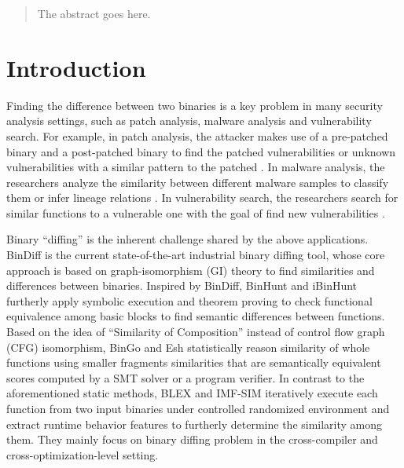 \documentclass[10pt,conference]{IEEEtran}
\begin{document}
\begin{abstract}
The abstract goes here.
\end{abstract}





%
\IEEEpeerreviewmaketitle



\section{Introduction}
Finding the difference between two binaries is a key problem in many security analysis settings, 
such as patch analysis, malware analysis and vulnerability search. 
For example, in patch analysis, the attacker makes use of a pre-patched binary and a post-patched binary to find the patched 
vulnerabilities \cite{brumley2008automatic} or unknown vulnerabilities with a similar pattern 
to the patched \cite{xu2017spain}. 
In malware analysis, the researchers analyze the similarity between different malware samples to classify 
them \cite{bayer2009scalable}\cite{hu2009large} or infer lineage relations \cite{jang2013towards}. 
In vulnerability search, the researchers search for similar functions to a vulnerable one with the goal of find new vulnerabilities
 \cite{eschweiler2016discovre}\cite{feng2016scalable}\cite{xu2017neural}.

Binary “diffing” is the inherent challenge shared by the above applications. 
BinDiff \cite{bindiff} is the current state-of-the-art industrial binary diffing tool, whose core approach is based on graph-isomorphism (GI) 
theory \cite{Dullien2005}\cite{flake2004structural} to find similarities and differences between binaries. 
Inspired by BinDiff, BinHunt \cite{gao2008binhunt} and iBinHunt \cite{ming2012ibinhunt} furtherly apply symbolic 
execution and theorem proving to check functional equivalence among basic blocks to find semantic differences between functions. 
Based on the idea of “Similarity of Composition” instead of control flow graph (CFG) isomorphism, BinGo \cite{chandramohan2016bingo}
 and Esh \cite{david2016statistical} statistically reason similarity of whole functions using smaller fragments similarities that 
 are semantically equivalent scores computed by a SMT solver or a program verifier. 
In contrast to the aforementioned static methods, BLEX \cite{egele2014blanket} and IMF-SIM \cite{wang2017memory} iteratively execute each 
 function from two input binaries under controlled randomized environment and extract runtime behavior features to furtherly 
 determine the similarity among them. They mainly focus on binary diffing problem in the cross-compiler and cross-optimization-level setting. 
\end{document}
